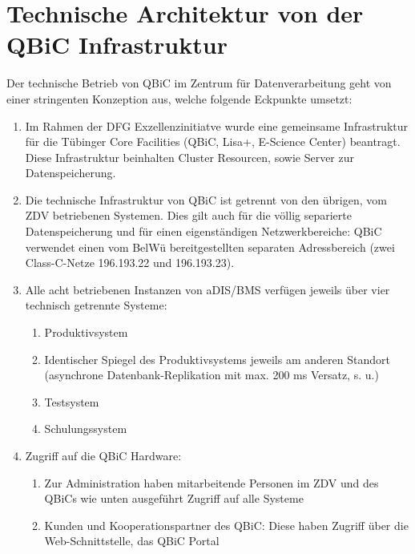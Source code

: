 \documentclass[]{scrreprt}
\begin{document}
\chapter{Technische Architektur von der QBiC Infrastruktur}

Der technische Betrieb von QBiC im Zentrum für Datenverarbeitung geht von einer stringenten Konzeption aus, welche folgende Eckpunkte umsetzt:

\begin{enumerate}
	\item Im Rahmen der DFG Exzellenzinitiatve wurde eine gemeinsame Infrastruktur für die Tübinger Core Facilities (QBiC, Lisa+, E-Science Center) beantragt. Diese Infrastruktur beinhalten Cluster Resourcen, sowie Server zur Datenspeicherung.
	
	\item Die technische Infrastruktur von QBiC ist getrennt von den übrigen, vom ZDV betriebenen Systemen. Dies gilt auch für die völlig separierte Datenspeicherung und für einen eigenständigen Netzwerkbereiche: QBiC verwendet einen vom BelWü bereitgestellten separaten Adressbereich (zwei Class-C-Netze 196.193.22 und 196.193.23).
	\item Alle acht betriebenen Instanzen von aDIS/BMS verfügen jeweils über vier technisch getrennte Systeme:
	
	\begin{enumerate}
		 \item Produktivsystem
	 	 \item Identischer Spiegel des Produktivsystems jeweils am anderen Standort
		(asynchrone Datenbank-Replikation mit max. 200 ms Versatz, s. u.)
		 \item Testsystem
		\item Schulungssystem
	\end{enumerate}

	\item Zugriff auf die QBiC Hardware:
	
	\begin{enumerate}
		\item Zur Administration haben mitarbeitende Personen im ZDV und des QBiCs wie unten ausgeführt Zugriff auf alle Systeme
		\item Kunden und Kooperationspartner des QBiC: Diese haben Zugriff über die Web-Schnittstelle, das QBiC Portal
	\end{enumerate}
	
	
\end{enumerate}
\end{document}

